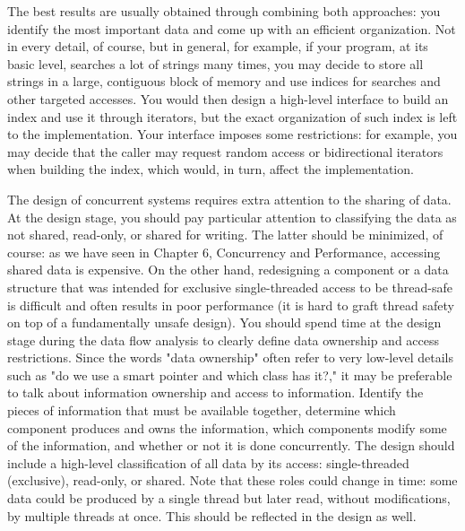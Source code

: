 The best results are usually obtained through combining both approaches: you identify the most important data and come up with an efficient organization. Not in every detail, of course, but in general, for example, if your program, at its basic level, searches a lot of strings many times, you may decide to store all strings in a large, contiguous block of memory and use indices for searches and other targeted accesses. You would then design a high-level interface to build an index and use it through iterators, but the exact organization of such index is left to the implementation. Your interface imposes some restrictions: for example, you may decide that the caller may request random access or bidirectional iterators when building the index, which would, in turn, affect the implementation. 

The design of concurrent systems requires extra attention to the sharing of data. At the design stage, you should pay particular attention to classifying the data as not shared, read-only, or shared for writing. The latter should be minimized, of course: as we have seen in Chapter 6, Concurrency and Performance, accessing shared data is expensive. On the other hand, redesigning a component or a data structure that was intended for exclusive single-threaded access to be thread-safe is difficult and often results in poor performance (it is hard to graft thread safety on top of a fundamentally unsafe design). You should spend time at the design stage during the data flow analysis to clearly define data ownership and access restrictions. Since the words "data ownership" often refer to very low-level details such as "do we use a smart pointer and which class has it?," it may be preferable to talk about information ownership and access to information. Identify the pieces of information that must be available together, determine which component produces and owns the information, which components modify some of the information, and whether or not it is done concurrently. The design should include a high-level classification of all data by its access: single-threaded (exclusive), read-only, or shared. Note that these roles could change in time: some data could be produced by a single thread but later read, without modifications, by multiple threads at once. This should be reflected in the design as well. 

